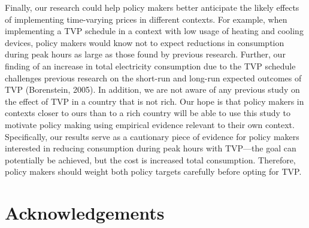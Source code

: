 \documentclass[12pt]{article}
\begin{document}
Finally, our research could help policy makers better anticipate the likely effects of implementing time-varying prices in different contexts. For example, when implementing a TVP schedule in a context with low usage of heating and cooling devices, policy makers would know not to expect reductions in consumption during peak hours as large as those found by previous research. Further, our finding of an increase in total electricity consumption due to the TVP schedule challenges previous research on the short-run and long-run expected outcomes of TVP (Borenstein, 2005). In addition, we are not aware of any previous study on the effect of TVP in a country that is not rich. Our hope is that policy makers in contexts closer to ours than to a rich country will be able to use this study to motivate policy making using empirical evidence relevant to their own context. Specifically, our results serve as a cautionary piece of evidence for policy makers interested in reducing consumption during peak hours with TVP---the goal can potentially be achieved, but the cost is increased total consumption. Therefore, policy makers should weight both policy targets carefully before opting for TVP.

\clearpage




\clearpage


\section*{Acknowledgements}



\clearpage
\end{document}
